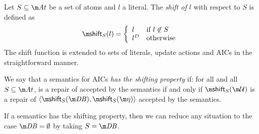 \begin{definition}
 Let $S\subseteq\atoms$ be a set of atoms and $l$ a literal. The \emph{shift of $l$} with respect to $S$ is defined as 
 \[\shift_S(l) = \left\{\begin{array}{ll}                                                                                                             l&\text{if $l\not\in S$}\\                                                                                                              l^D&\text{otherwise}                                                                                                                                      \end{array}\right.\]
 The shift function is extended to sets of literals, update actions and AICs in the straightforward manner. 
\end{definition}

\begin{definition}
 We say that a semantics for AICs \emph{has the shifting property} if: for all \fulldb and all $S\subseteq \atoms$, \UU is a repair of \fulldb accepted by the semantics if and only if $\shift_S(\UU)$ is a repair of $\langle\shift_S(\db),\shift_S(\aics)\rangle$ accepted by the semantics.
\end{definition}

If a semantics has the shifting property, then we can reduce any situation to the case $\db=\emptyset$ by taking $S=\db$. 
